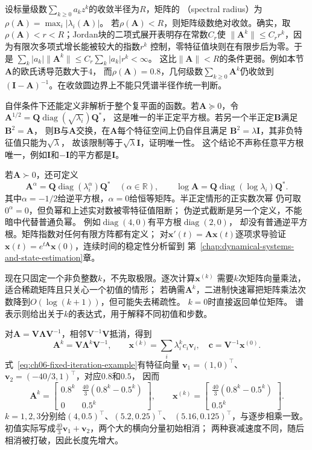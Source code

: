 设标量级数$\sum_{k\geq0}a_kz^k$的收敛半径为$R$，矩阵的
（spectral radius）为
$\rho(\bm A)=\max_i|\lambda_i(\bm A)|$。
若$\rho(\bm A)<R$，则矩阵级数绝对收敛。确实，取
$\rho(\bm A)<r<R$；Jordan块的二项式展开表明存在常数$C_r$使
$\lVert\bm A^k\rVert\leq C_r r^k$，因为有限次多项式增长能被较大的指数$r^k$
控制，零特征值块则在有限步后为零。于是
$\sum_k|a_k|\lVert\bm A^k\rVert\leq C_r\sum_k|a_k|r^k<\infty$。
这比$\lVert\bm A\rVert<R$的条件更弱。例如本节$\bm A$的欧氏诱导范数大于$4$，
而$\rho(\bm A)=0.8$，几何级数$\sum_{k\geq0}\bm A^k$仍收敛到
$(\bm I-\bm A)^{-1}$。在收敛圆边界上不能只凭谱半径作统一判断。

自伴条件下还能定义非解析于整个复平面的函数。若$\bm A\succeq0$，令
$\bm A^{1/2}=\bm Q\operatorname{diag}(\sqrt{\lambda_i})\bm Q^*$，
这是唯一的半正定平方根。若另一个半正定$\bm B$满足$\bm B^2=\bm A$，
则$\bm B$与$\bm A$交换，在$\bm A$每个特征空间上仍自伴且满足
$\bm B^2=\lambda\bm I$，其非负特征值只能为$\sqrt\lambda$，
故该限制等于$\sqrt\lambda\bm I$，证明唯一性。
这个结论不声称任意平方根唯一，例如$\bm I$和$-\bm I$的平方都是$\bm I$。

若$\bm A\succ0$，还可定义
\[
 \bm A^\alpha=\bm Q\operatorname{diag}(\lambda_i^\alpha)\bm Q^*
 \quad(\alpha\in\mathbb R),\qquad
 \log\bm A=\bm Q\operatorname{diag}(\log\lambda_i)\bm Q^*.
\]
其中$\alpha=-1/2$给逆平方根，$\alpha=0$给恒等矩阵。半正定情形的正实数次幂
仍可取$0^\alpha=0$，但负幂和上述实对数被零特征值阻断；
伪逆式截断是另一个定义，不能暗中代替普通负幂。
例如$\operatorname{diag}(4,0)$有平方根$\operatorname{diag}(2,0)$，
却没有普通逆平方根。矩阵指数对任何有限方阵都有定义；
对$\bm x'(t)=\bm A\bm x(t)$逐项求导验证
$\bm x(t)=e^{t\bm A}\bm x(0)$，连续时间的稳定性分析留到
第~\ref{chap:dynamical-systems-and-state-estimation}章。


现在只固定一个非负整数$k$，不先取极限。逐次计算$\bm x^{(k)}$
需要$k$次矩阵向量乘法，适合稀疏矩阵且只关心一个初值的情形；
若确需$\bm A^k$，二进制快速幂把矩阵乘法次数降到$O(\log(k+1))$，但可能失去稀疏性。
$k=0$时直接返回单位矩阵。
谱表示则给出关于$k$的表达式，用于解释不同初值和步数。


对$\bm A=\bm V\bm\Lambda\bm V^{-1}$，相邻$\bm V^{-1}\bm V$抵消，得到
\[
 \bm A^k=\bm V\bm\Lambda^k\bm V^{-1},\qquad
 \bm x^{(k)}=\sum_i\lambda_i^k c_i\bm v_i,\quad
 \bm c=\bm V^{-1}\bm x^{(0)}.
\]
式~\eqref{eq:ch06-fixed-iteration-example}有特征向量
$\bm v_1=(1,0)^\top$、$\bm v_2=(-40/3,1)^\top$，对应$0.8$和$0.5$，
因而
\begin{equation}
 \bm A^k=
 \begin{bmatrix}
  0.8^k&\frac{40}{3}(0.8^k-0.5^k)\\
  0&0.5^k
 \end{bmatrix},\qquad
 \bm x^{(k)}=
 \begin{bmatrix}\frac{40}{3}(0.8^k-0.5^k)\\0.5^k\end{bmatrix}.
 \label{eq:ch06-diagonalizable-finite-trajectory}
\end{equation}
$k=1,2,3$分别给$(4,0.5)^\top$、$(5.2,0.25)^\top$、
$(5.16,0.125)^\top$，与逐步相乘一致。
初值实际写成$\tfrac{40}{3}\bm v_1+\bm v_2$，两个大的横向分量初始相消；
两种衰减速度不同，随后相消被打破，因此长度先增大。

